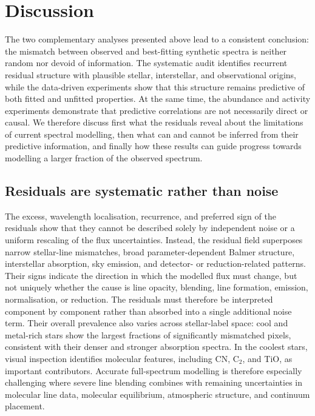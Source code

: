 \documentclass[twocolumn,apj,numberedappendix,appendixfloats]{openjournal}
\begin{document}
\section{Discussion}
\label{sec:discussion}

The two complementary analyses presented above lead to a consistent conclusion: the mismatch between observed and best-fitting synthetic spectra is neither random nor devoid of information. The systematic audit identifies recurrent residual structure with plausible stellar, interstellar, and observational origins, while the data-driven experiments show that this structure remains predictive of both fitted and unfitted properties. At the same time, the abundance and activity experiments demonstrate that predictive correlations are not necessarily direct or causal. We therefore discuss first what the residuals reveal about the limitations of current spectral modelling, then what can and cannot be inferred from their predictive information, and finally how these results can guide progress towards modelling a larger fraction of the observed spectrum.

\subsection{Residuals are systematic rather than noise}
\label{sec:discussion_systematic}

The excess, wavelength localisation, recurrence, and preferred sign of the residuals show that they cannot be described solely by independent noise or a uniform rescaling of the flux uncertainties. Instead, the residual field superposes narrow stellar-line mismatches, broad parameter-dependent Balmer structure, interstellar absorption, sky emission, and detector- or reduction-related patterns. Their signs indicate the direction in which the modelled flux must change, but not uniquely whether the cause is line opacity, blending, line formation, emission, normalisation, or reduction. The residuals must therefore be interpreted component by component rather than absorbed into a single additional noise term. Their overall prevalence also varies across stellar-label space: cool and metal-rich stars show the largest fractions of significantly mismatched pixels, consistent with their denser and stronger absorption spectra. In the coolest stars, visual inspection identifies molecular features, including CN, $\mathrm{C}_2$, and TiO, as important contributors. Accurate full-spectrum modelling is therefore especially challenging where severe line blending combines with remaining uncertainties in molecular line data, molecular equilibrium, atmospheric structure, and continuum placement.
\end{document}

